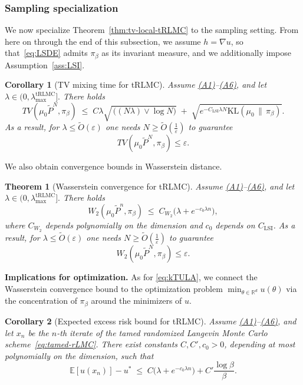 \documentclass[11pt,a4paper,reqno]{amsart}
\theoremstyle{plain}
\newtheorem{theorem}{Theorem}
\newtheorem{corollary}{Corollary}
\theoremstyle{definition}
\theoremstyle{remark}
\newcommand{\R}{\mathbb{R}}
\newcommand{\E}{\mathbb{E}}
\newcommand{\KL}{\mathrm{KL}}
\begin{document}
\subsubsection{Sampling specialization}
\label{subsubsec:trlmc-sampling}

We now specialize Theorem~\ref{thm:tv-local-tRLMC} to the sampling setting. From here on through the end of this subsection, we assume $h=\nabla u$, so that~\eqref{eq:LSDE} admits $\pi_\beta$ as its invariant measure, and we additionally impose Assumption~\ref{ass:LSI}.

\begin{corollary}[TV mixing time for tRLMC]
\label{cor:tv-mixing-trlmc}
Assume \hyperref[ass:PJG]{\textup{(A1)}}--\hyperref[ass:LSI]{\textup{(A6)}}, and
let \(\lambda\in(0,\lambda_{\max}^{\mathrm{tRLMC}}].\)
There holds
\[
TV(\mu_0 \widetilde P^N,\pi_\beta)
\;\le\;
C\lambda \sqrt{\,\bigl((N\lambda)\vee \log N\bigr)}
\;+\;
\sqrt{e^{-C_{\mathrm{LSI}}\lambda N} \KL(\mu_0\,\|\,\pi_\beta)}.
\]
As a result, for $\lambda\le \widetilde O({\varepsilon})$ one needs $N\ge \widetilde O\!\left(\frac{1}{\varepsilon}\right)$ to guarantee
\[
TV(\mu_0\widetilde P^N,\pi_\beta)\le \varepsilon.
\]
\end{corollary}

\medskip
\noindent
We also obtain convergence bounds in Wasserstein distance.

\begin{theorem}[Wasserstein convergence for tRLMC]
\label{thm:wass conv}
Assume \hyperref[ass:PJG]{\textup{(A1)}}--\hyperref[ass:LSI]{\textup{(A6)}}, and
let \(\lambda\in(0,\lambda_{\max}^{\mathrm{tRLMC}}].\)
There holds
\[
W_2(\mu_0\widetilde P^n,\pi_\beta)\;\le\; C_{W_2}\bigl(\lambda+e^{-c_0\lambda n}\bigr),
\]
where $C_{W_2}$ depends polynomially on the dimension and $c_0$ depends on $C_{\mathrm{LSI}}$.
As a result, for $\lambda\le \widetilde O({\varepsilon})$ one needs $N\ge \widetilde O\!\left(\frac{1}{\varepsilon}\right)$ to guarantee
\[
W_2(\mu_0\widetilde P^N,\pi_\beta)\le \varepsilon.
\]
\end{theorem}

\medskip
\noindent\textbf{Implications for optimization.}
As for \eqref{eq:kTULA}, we connect the Wasserstein convergence bound to the optimization problem $\min_{\theta\in\R^d} u(\theta)$ via the concentration of $\pi_\beta$ around the minimizers of $u$.

\begin{corollary}[Expected excess risk bound for tRLMC]
\label{cor:excess-risk-trlmc}
Assume \hyperref[ass:PJG]{\textup{(A1)}}--\hyperref[ass:LSI]{\textup{(A6)}}, and let $x_n$ be the $n$-th iterate of the tamed randomized Langevin Monte Carlo scheme~\eqref{eq:tamed-rLMC}.
There exist constants $C,C',c_0>0$, depending at most polynomially on the dimension, such that
\[
\E[u(x_n)]-u^*\;\le\; C\bigl(\lambda+e^{-c_0\lambda n}\bigr) + C'\frac{\log \beta}{\beta}.
\]
\end{corollary}
\end{document}
